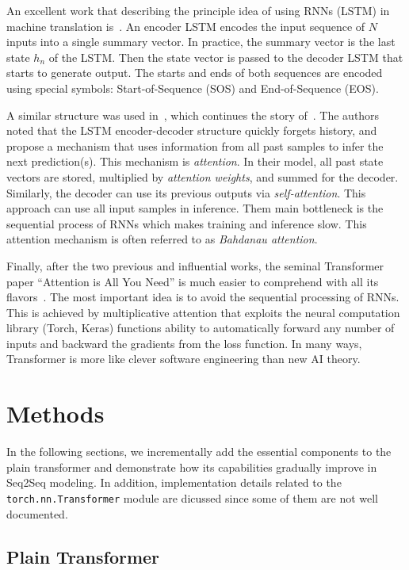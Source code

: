 \documentclass[final]{article}
\begin{document}
An excellent work that describing the principle idea of using RNNs
(LSTM) in machine translation is~\cite{Sutskever-2014-neurips}.
An encoder LSTM encodes the input sequence of $N$ inputs into a single summary vector.
In practice, the summary vector is the last state $h_n$ of the LSTM. Then
the state vector is passed to the decoder LSTM that starts to generate
output. The starts and ends of both sequences are encoded using
special symbols: Start-of-Sequence (SOS) and End-of-Sequence (EOS).

A similar structure was used in~\cite{Cho-2014-emnlp}, which continues the story of~\cite{Sutskever-2014-neurips}. The authors noted that the LSTM encoder-decoder
structure quickly forgets history, and propose a mechanism that uses
information from all past samples to infer the next prediction(s).
This mechanism is \textit{attention}. In their model,  all past state
vectors are stored, multiplied by \textit{attention weights}, and
summed for the decoder. Similarly, the decoder can use its previous
outputs via \textit{self-attention}. This approach can use all input samples in
inference. Them main bottleneck is the sequential process of RNNs
which makes training and inference slow. This attention mechanism is
often referred to as \textit{Bahdanau attention}.

Finally, after the two previous and influential works, the seminal
Transformer paper ``Attention is All You Need'' is much easier to
comprehend with all its flavors~\cite{transformer}. The most important
idea is to avoid the sequential processing of RNNs. This is achieved
by multiplicative attention that exploits the neural computation
library (Torch, Keras) functions ability to automatically forward any
number of inputs and backward the gradients from the loss function. In
many ways, Transformer is more like clever software engineering than
new AI theory.


\section{Methods}

In the following sections, we incrementally add the essential
components to the plain transformer and demonstrate how its
capabilities gradually improve in Seq2Seq modeling. In addition, implementation details related to the \texttt{torch.nn.Transformer} module are dicussed since some of them are not well documented.

\subsection{Plain Transformer}
\label{sec:PlainTransformer}
\end{document}
